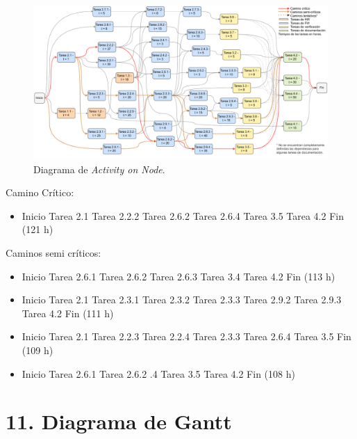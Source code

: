\documentclass[
11pt, %
]{charter}
\begin{document}
\begin{figure}[htpb]
\centering 
\includegraphics[width=\textwidth]{../Figuras/aon.drawio.pdf}
\caption{Diagrama de \textit{Activity on Node}.}
\label{fig:AoN}
\end{figure}

Camino Crítico: 
\begin{itemize}
	\item Inicio \textrightarrow  Tarea 2.1 \textrightarrow  Tarea 2.2.2 \textrightarrow  Tarea 2.6.2 \textrightarrow  Tarea 2.6.4 \textrightarrow  Tarea 3.5 \textrightarrow  Tarea 4.2 \textrightarrow  Fin (121 h)
\end{itemize}

Caminos semi críticos:
\begin{itemize}
	\item Inicio \textrightarrow  Tarea 2.6.1 \textrightarrow  Tarea 2.6.2 \textrightarrow  Tarea 2.6.3 \textrightarrow  Tarea 3.4 \textrightarrow  Tarea 4.2 \textrightarrow  Fin (113 h)
	\item Inicio \textrightarrow  Tarea 2.1 \textrightarrow  Tarea 2.3.1 \textrightarrow  Tarea 2.3.2 \textrightarrow  Tarea 2.3.3 \textrightarrow  Tarea 2.9.2 \textrightarrow  Tarea 2.9.3  \textrightarrow  Tarea 4.2 \textrightarrow  Fin (111 h)
	\item Inicio \textrightarrow  Tarea 2.1 \textrightarrow  Tarea 2.2.3 \textrightarrow  Tarea 2.2.4 \textrightarrow  Tarea 2.3.3 \textrightarrow  Tarea 2.6.4 \textrightarrow  Tarea 3.5  \textrightarrow  Fin (109 h)
	\item Inicio \textrightarrow  Tarea 2.6.1 \textrightarrow  Tarea 2.6.2 .4 \textrightarrow  Tarea 3.5 \textrightarrow  Tarea 4.2 \textrightarrow  Fin (108 h)
\end{itemize}


\section{11. Diagrama de Gantt}
\label{sec:gantt}
\end{document}
